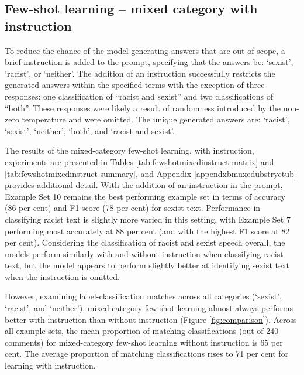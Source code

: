 \documentclass[12pt,]{article}
\begin{document}
\hypertarget{few-shot-learning-mixed-category-with-instruction}{%
\subsection{Few-shot learning -- mixed category with instruction}\label{few-shot-learning-mixed-category-with-instruction}}

To reduce the chance of the model generating answers that are out of scope, a brief instruction is added to the prompt, specifying that the answers be: `sexist', `racist', or `neither'. The addition of an instruction successfully restricts the generated answers within the specified terms with the exception of three responses: one classification of ``racist and sexist'' and two classifications of ``both''. These responses were likely a result of randomness introduced by the non-zero temperature and were omitted. The unique generated answers are: `racist', `sexist', `neither', `both', and `racist and sexist'.

The results of the mixed-category few-shot learning, with instruction, experiments are presented in Tables \ref{tab:fewshotmixedinstruct-matrix} and \ref{tab:fewshotmixedinstruct-summary}, and Appendix \ref{appendxbmuxedubstryctub} provides additional detail. With the addition of an instruction in the prompt, Example Set 10 remains the best performing example set in terms of accuracy (86 per cent) and F1 score (78 per cent) for sexist text. Performance in classifying racist text is slightly more varied in this setting, with Example Set 7 performing most accurately at 88 per cent (and with the highest F1 score at 82 per cent). Considering the classification of racist and sexist speech overall, the models perform similarly with and without instruction when classifying racist text, but the model appears to perform slightly better at identifying sexist text when the instruction is omitted.

However, examining label-classification matches across all categories (`sexist', `racist', and `neither'), mixed-category few-shot learning almost always performs better with instruction than without instruction (Figure \ref{fig:comparison}). Across all example sets, the mean proportion of matching classifications (out of 240 comments) for mixed-category few-shot learning without instruction is 65 per cent. The average proportion of matching classifications rises to 71 per cent for learning with instruction.
\end{document}
